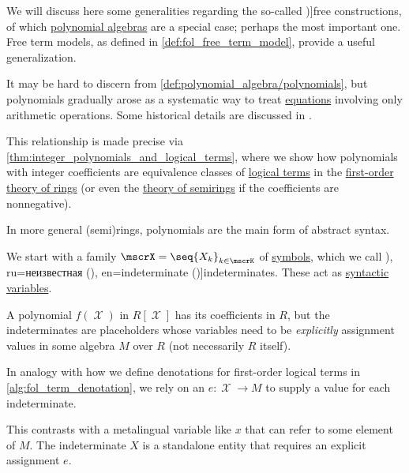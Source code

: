 \begin{concept}\label{con:free_construction}
  We will discuss here some generalities regarding the so-called \term[en=free construction (\cite[192]{Perrone2024StartingCategoryTheory})]{free constructions}, of which \hyperref[def:polynomial_algebra]{polynomial algebras} are a special case; perhaps the most important one. Free term models, as defined in \cref{def:fol_free_term_model}, provide a useful generalization.

  It may be hard to discern from \cref{def:polynomial_algebra/polynomials}, but polynomials gradually arose as a systematic way to treat \hyperref[def:equation]{equations} involving only arithmetic operations. Some historical details are discussed in \cite{HSMSE:origin_of_polynomials}.

  This relationship is made precise via \cref{thm:integer_polynomials_and_logical_terms}, where we show how polynomials with integer coefficients are equivalence classes of \hyperref[def:fol_term]{logical terms} in the \hyperref[def:ring/theory]{first-order theory of rings} (or even the \hyperref[def:semiring/theory]{theory of semirings} if the coefficients are nonnegative).

  In more general (semi)rings, polynomials are the main form of abstract syntax.

  \begin{thmenum}
     We start with a family \( \mscrX = \seq{ X_k }_{k \in \mscrK} \) of \hyperref[def:formal_language/symbol]{symbols}, which we call \term[bg=неизвестно (\cite[405]{Обрешков1962ВисшаАлгебра}), ru=неизвестная (\cite[131]{Курош1968КурсВысшейАлгебры}), en=indeterminate (\cite[def. III.1.19]{Aluffi2009Algebra})]{indeterminates}. These act as \hyperref[con:variable]{syntactic variables}.

    A polynomial \( f(\mscrX) \) in \( R[\mscrX] \) has its coefficients in \( R \), but the indeterminates are placeholders whose variables need to be \emph{explicitly} assignment values in some algebra \( M \) over \( R \) (not necessarily \( R \) itself).

     In analogy with how we define denotations for first-order logical terms in \cref{alg:fol_term_denotation}, we rely on an  \( e: \mscrX \to M \) to supply a value for each indeterminate.

    This contrasts with a metalingual variable like \( x \) that can refer to some element of \( M \). The indeterminate \( X \) is a standalone entity that requires an explicit assignment \( e \).


\end{thmenum}
\end{concept}
